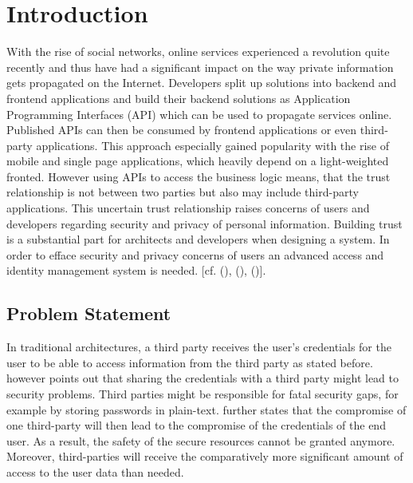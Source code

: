 \chapter{Introduction}\label{chap:introduction}
\chapterstart

With the rise of social networks, online services experienced a revolution quite recently and thus have had a significant impact on the way private information gets propagated on the Internet. Developers split up solutions into backend and frontend applications and build their backend solutions as Application Programming Interfaces (API) which can be used to propagate services online. Published APIs can then be consumed by frontend applications or even third-party applications. This approach especially gained popularity with the rise of mobile and single page applications, which heavily depend on a light-weighted fronted. However using APIs to access the business logic means, that the trust relationship is not between two parties but also may include third-party applications. This uncertain trust relationship raises concerns of users and developers regarding security and privacy of personal information. Building trust is a substantial part for architects and developers when designing a system. In order to efface security and privacy concerns of users an advanced access and identity management system is needed. [cf. (\cite{Cirani:OBAS}), (\cite{Tkalec:2015}), (\cite{Rossvoll:2013:RUBIM})].


\section{Problem Statement}

In traditional architectures, a third party receives the user’s credentials for the user to be able to access information from the third party as stated before. \cite{Prasad:MMWPT} however points out that sharing the credentials with a third party might lead to security problems. Third parties might be responsible for fatal security gaps, for example by storing passwords in plain-text. \cite{Prasad:MMWPT} further states that the compromise of one third-party will then lead to the compromise of the credentials of the end user. As a result, the safety of the secure resources cannot be granted anymore. Moreover, third-parties will receive the comparatively more significant amount of access to the user data than needed.

